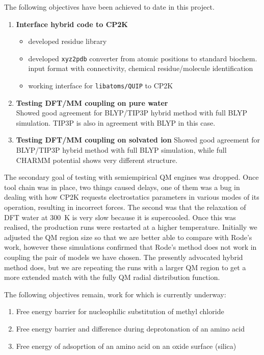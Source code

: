 \documentclass[11pt]{revtex4}
\begin{document}
The following objectives have been achieved to date in this project.
\begin{enumerate}
\item {\bf Interface hybrid code to CP2K}\\
  \begin{itemize}
    \item developed residue library
    \item developed {\tt xyz2pdb} converter from atomic positions to standard biochem. input format with connectivity, chemical residue/molecule identification
    \item working interface for {\tt libatoms/QUIP} to CP2K
  \end{itemize}
\item {\bf Testing DFT/MM coupling on pure water} \\
  Showed good agreement for BLYP/TIP3P hybrid method with full BLYP simulation.  TIP3P is also in agreement with BLYP in this case.
\item {\bf Testing DFT/MM coupling on solvated ion}
  Showed good agreement for BLYP/TIP3P hybrid method with full BLYP simulation, while full CHARMM potential shows very different structure.
\end{enumerate}

The secondary goal of testing with semiempirical QM engines was dropped. Once tool chain was in place, two things caused delays, one of them was a bug in dealing with how CP2K requests electrostatics parameters in various modes of its operation, resulting in incorrect forces. The second was that the relaxation of DFT water at 300~K is very slow because it is supercooled.  Once this was realised, the production runs were restarted at a higher temperature. Initially we adjusted the QM region size so that we are  better able to compare with Rode's work, however these simulations confirmed that Rode's method does not work in coupling the pair of models we have chosen. The presently advocated hybrid method does, but we are repeating the runs with a larger QM region to get a more extended match with the fully QM radial distribution function.

The following objectives remain, work for which is currently underway:
\begin{enumerate}
\item{Free energy barrier for nucleophilic substitution of methyl chloride}
\item{Free energy barrier and difference during deprotonation of an amino acid}
\item{Free energy of adsoprtion of an amino acid on an oxide surface (silica)}
\end{enumerate}


\end{document}
